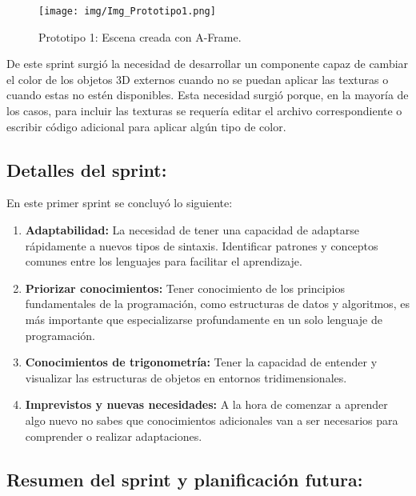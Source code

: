 \documentclass[a4paper, 12pt]{book}
\begin{document}
            \begin{figure}[H]
                \centering
                \texttt{[image: img/Img\_Prototipo1.png]}
                \caption{Prototipo 1: Escena creada con A-Frame.}
                \label{fig:Prototipo1}
            \end{figure}
            
            De este sprint surgió la necesidad de desarrollar un componente capaz de cambiar el color de los objetos 3D externos cuando no se puedan aplicar las texturas o cuando estas no estén disponibles. Esta necesidad surgió porque, en la mayoría de los casos, para incluir las texturas se requería editar el archivo correspondiente o escribir código adicional para aplicar algún tipo de color.

            \subsection{Detalles del sprint:}
            
            En este primer sprint se concluyó lo siguiente:
            \begin{enumerate}
                \item \textbf{Adaptabilidad:} La necesidad de tener una capacidad de adaptarse rápidamente a nuevos tipos de sintaxis. Identificar patrones y conceptos comunes entre los lenguajes para facilitar el aprendizaje.
                \item \textbf{Priorizar conocimientos:} Tener conocimiento de los principios fundamentales de la programación, como estructuras de datos y algoritmos, es más importante que especializarse profundamente en un solo lenguaje de programación.
                \item \textbf{Conocimientos de trigonometría:} Tener la capacidad de entender y visualizar las estructuras de objetos en entornos tridimensionales.
                \item \textbf{Imprevistos y nuevas necesidades:} A la hora de comenzar a aprender algo nuevo no sabes que conocimientos adicionales van a ser necesarios para comprender o realizar adaptaciones.
            \end{enumerate}

            \subsection{Resumen del sprint y planificación futura:} 
\end{document}
